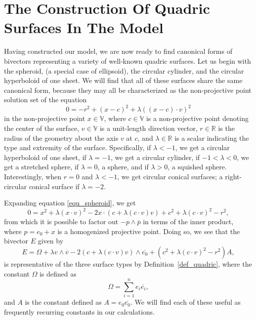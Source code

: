 \documentclass[12pt]{article}
\newcommand{\V}{\mathbb{V}}
\newcommand{\R}{\mathbb{R}}
\numberwithin{equation}{section}
\begin{document}
\section{The Construction Of Quadric Surfaces In The Model}

Having constructed our model, we are now ready to find canonical forms of bivectors
representing a variety of well-known quadric surfaces.  Let us begin with the
spheroid, (a special case of ellipsoid), the circular cylinder, and the circular hyperboloid
of one sheet.  We will find that all of these surfaces share the same canonical form,
because they may all be characterized as the non-projective point solution set of the equation
\begin{equation}\label{equ_spheroid}
0 = -r^2 + (x-c)^2 + \lambda((x-c)\cdot v)^2
\end{equation}
in the non-projective point $x\in\V$, where $c\in\V$ is a non-projective
point denoting the center of the surface, $v\in\V$ is a unit-length direction
vector, $r\in\R$ is the radius of the geometry about the axis $v$ at $c$, and
$\lambda\in\R$ is a scalar indicating the type and extremity of the surface.
Specifically, if $\lambda<-1$, we get a circular hyperboloid of one sheet,
if $\lambda=-1$, we get a circular cylinder, if $-1<\lambda<0$, we get a stretched
sphere, if $\lambda=0$, a sphere, and if $\lambda>0$, a squished sphere.  Interestingly,
when $r=0$ and $\lambda<-1$, we get circular conical surfaces; a right-circular conical
surface if $\lambda=-2$.

Expanding equation \eqref{equ_spheroid}, we get
\begin{equation}
0 = x^2 + \lambda(x\cdot v)^2 - 2x\cdot (c+\lambda(c\cdot v)v) + c^2 + \lambda(c\cdot v)^2 - r^2,
\end{equation}
from which it is possible to factor out $-p\wedge\overline{p}$
in terms of the inner product, where $p=e_0+x$
is a homogenized projective point.  Doing so, we see that the bivector
$E$ given by
\begin{equation}\label{equ_spheroid_bivector}
E = \Omega + \lambda v\wedge\overline{v} - 2(c+\lambda(c\cdot v)v)\wedge\overline{e_0} + (c^2+\lambda(c\cdot v)^2-r^2)A,
\end{equation}
is representative of the three surface types by Definition~\ref{def_quadric}, where the constant
$\Omega$ is defined as
\begin{equation}
\Omega=\sum_{i=1}^n e_i\overline{e_i},
\end{equation}
and $A$ is the constant defined as $A=e_0\overline{e_0}$.  We will find each of these useful as
frequently recurring constants in our calculations.
\end{document}

